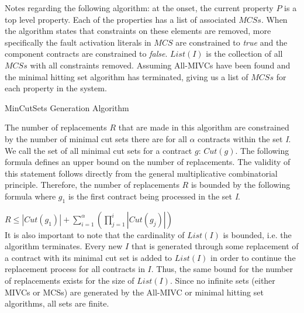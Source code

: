 Notes regarding the following algorithm: at the onset, the current property $P$ is a top level property. Each of the properties has a list of associated $MCSs$. When the algorithm states that constraints on these elements are removed, more specifically the fault activation literals in $MCS$ are constrained to \textit{true} and the component contracts are constrained to \textit{false}. $List(I)$ is the collection of all $MCSs$ with all constraints removed. Assuming All-MIVCs have been found and the minimal hitting set algorithm has terminated, giving us a list of $MCSs$ for each property in the system. 


\begin{algorithm}[H]

	\caption{MinCutSets Generation Algorithm}
	\label{alg:generation_alg}
\end{algorithm}

The number of replacements $R$ that are made in this algorithm are constrained by the number of minimal cut sets there are 
for all $\alpha$ contracts within the set \textit{I}. %
We call the set of all minimal cut sets for a contract $g$: $Cut(g)$. The following formula defines an upper bound on the number of replacements. The validity of this statement follows directly from the general multiplicative combinatorial principle. Therefore, the number of replacements $R$ is bounded by the following formula where $g_1$ is the first contract being processed in the set \textit{I}.

$R \leq |Cut(g_1)| +  {\displaystyle \sum_{i=1}^{\alpha} }({\displaystyle \prod_{j=1}^{i} |Cut(g_j)|})$\\ 

It is also important to note that the cardinality of $List(I)$ is bounded, i.e. the algorithm terminates. Every new $I$ that is generated through some replacement of a contract with its minimal cut set is added to $List(I)$ in order to continue the replacement process for all contracts in $I$. Thus, the same bound for the number of replacements exists for the size of $List(I)$. Since no infinite sets (either MIVCs or MCSs) are generated by the All-MIVC or minimal hitting set algorithms, all sets are finite.

